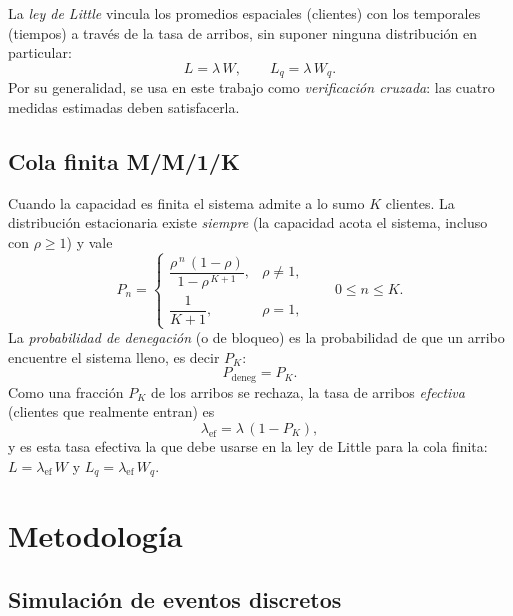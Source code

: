\documentclass[11pt]{article}
\begin{document}
La \emph{ley de Little} vincula los promedios espaciales (clientes) con los
temporales (tiempos) a trav\'es de la tasa de arribos, sin suponer ninguna
distribuci\'on en particular:
\begin{equation}
L = \lambda\,W,
\qquad
L_q = \lambda\,W_q.
\end{equation}
Por su generalidad, se usa en este trabajo como \emph{verificaci\'on
cruzada}: las cuatro medidas estimadas deben satisfacerla.

\subsection{Cola finita M/M/1/K}

Cuando la capacidad es finita el sistema admite a lo sumo $K$ clientes. La
distribuci\'on estacionaria existe \emph{siempre} (la capacidad acota el
sistema, incluso con $\rho \ge 1$) y vale
\begin{equation}
P_n =
\begin{cases}
\dfrac{\rho^{\,n}\,(1-\rho)}{1-\rho^{\,K+1}}, & \rho \neq 1, \\[1.2em]
\dfrac{1}{K+1}, & \rho = 1,
\end{cases}
\qquad 0 \le n \le K.
\end{equation}
La \emph{probabilidad de denegaci\'on} (o de bloqueo) es la probabilidad de
que un arribo encuentre el sistema lleno, es decir $P_K$:
\begin{equation}
P_{\text{deneg}} = P_K.
\end{equation}
Como una fracci\'on $P_K$ de los arribos se rechaza, la tasa de arribos
\emph{efectiva} (clientes que realmente entran) es
\begin{equation}
\lambda_{\text{ef}} = \lambda\,(1 - P_K),
\end{equation}
y es esta tasa efectiva la que debe usarse en la ley de Little para la cola
finita: $L = \lambda_{\text{ef}}\,W$ y $L_q = \lambda_{\text{ef}}\,W_q$.

\section{Metodolog\'ia}

\subsection{Simulaci\'on de eventos discretos}
\end{document}
